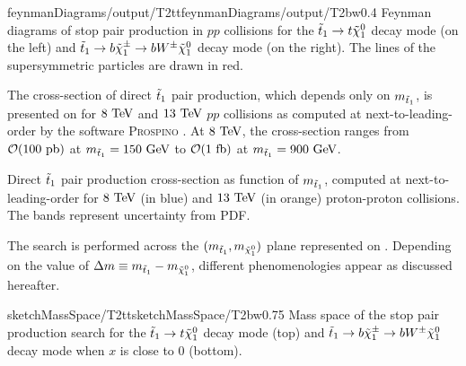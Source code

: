                      {feynmanDiagrams/output/T2tt}{feynmanDiagrams/output/T2bw}{0.4}
                     {Feynman diagrams of stop pair production in $pp$
                     collisions for the $\tilde{t}_1 \rightarrow t \tilde{\chi}_1^0$
                     decay mode (on the left) and $\tilde{t}_1 \rightarrow b
                     \tilde{\chi}_1^\pm \rightarrow b W^{\pm} \tilde{\chi}_1^0$ decay mode
                     (on the right). The lines of the supersymmetric particles
                     are drawn in red.}

    The cross-section of direct $\tilde{t}_1$ pair production, which depends only on
    $m_{\tilde{t}_1}$, is presented on  for $8~\text{TeV}$ and
    $13~\text{TeV}$ $pp$ collisions as computed at next-to-leading-order by the
    software \textsc{Prospino} \cite{Prospino, Prospino2}.  At $8~\text{TeV}$, the
    cross-section ranges from $\mathcal{O}(100~\text{pb})$ at $m_{\tilde{t}_1} = 150~\text{GeV}$ to
    $\mathcal{O}(1~\text{fb})$ at $m_{\tilde{t}_1} = 900 ~\text{GeV}$.

     {Direct $\tilde{t}_1$ pair production
    cross-section as function of $m_{\tilde{t}_1}$, computed at
    next-to-leading-order for $8~\text{TeV}$ (in blue) and $13~\text{TeV}$ (in orange)
    proton-proton collisions. The bands represent uncertainty from PDF.}

    The search is performed across the $(m_{\tilde{t}_1},m_{\tilde{\chi}_1^0})$
    plane represented on . Depending on the value of
    $\Delta m \equiv m_{\tilde{t}_1} - m_{\tilde{\chi}_1^0}$, different
    phenomenologies appear as discussed hereafter.

                 {sketchMassSpace/T2tt}{sketchMassSpace/T2bw}{0.75}
                 {Mass space of the stop pair production search for the $\tilde{t}_1
                 \rightarrow t \tilde{\chi}_1^0$ decay mode (top) and $\tilde{t}_1
                 \rightarrow b \tilde{\chi}_1^\pm \rightarrow b W^{\pm} \tilde{\chi}_1^0 $
                 decay mode when $x$ is close to 0 (bottom).}

